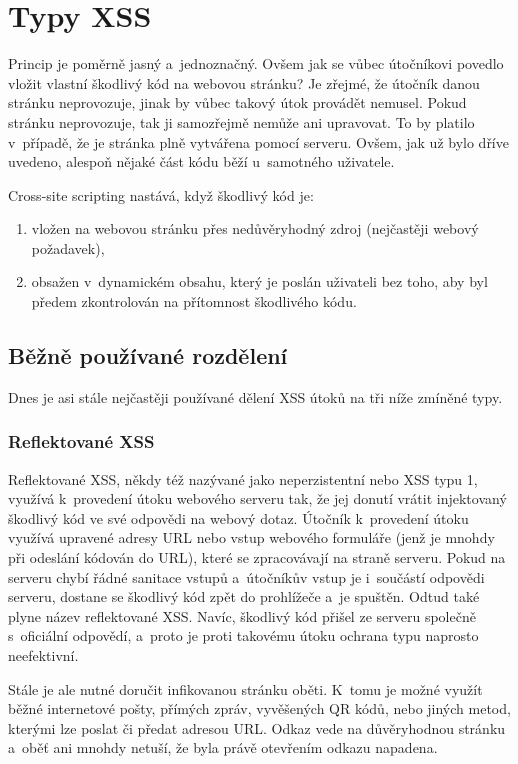 \documentclass[11pt, conference, a4paper]{IEEEtran}
\begin{document}
\section{Typy XSS}
Princip je poměrně jasný a~jednoznačný. Ovšem jak se vůbec útočníkovi povedlo vložit vlastní škodlivý kód na webovou stránku? Je zřejmé, že útočník danou stránku neprovozuje, jinak by vůbec takový útok provádět nemusel. Pokud stránku neprovozuje, tak ji samozřejmě nemůže ani upravovat. To by platilo v~případě, že je stránka plně vytvářena pomocí serveru. Ovšem, jak už bylo dříve uvedeno, alespoň nějaké část kódu běží u~samotného uživatele. 

Cross-site scripting nastává, když škodlivý kód je:
\begin{enumerate}
    \item vložen na webovou stránku přes nedůvěryhodný zdroj (nejčastěji webový požadavek),
    \item obsažen v~dynamickém obsahu, který je poslán uživateli bez toho, aby byl předem zkontrolován na přítomnost škodlivého kódu.
\end{enumerate}

\subsection{Běžně používané rozdělení}
Dnes je asi stále nejčastěji používané dělení XSS útoků na tři níže zmíněné typy. 

\subsubsection{Reflektované XSS}
Reflektované XSS, někdy též nazývané jako neperzistentní nebo XSS typu 1, využívá k~provedení útoku webového serveru tak, že jej donutí vrátit injektovaný škodlivý kód ve své odpovědi na webový dotaz. Útočník k~provedení útoku využívá upravené adresy URL nebo vstup webového formuláře (jenž je mnohdy při odeslání kódován do URL), které se zpracovávají na straně serveru. Pokud na serveru chybí řádné sanitace vstupů a~útočníkův vstup je i~součástí odpovědi serveru, dostane se škodlivý kód zpět do prohlížeče a~je spuštěn. Odtud také plyne název reflektované XSS. Navíc, škodlivý kód přišel ze serveru společně s~oficiální odpovědí, a~proto je proti takovému útoku ochrana typu  naprosto neefektivní. 

Stále je ale nutné doručit infikovanou stránku oběti. K~tomu je možné využít běžné internetové pošty, přímých zpráv, vyvěšených QR kódů, nebo jiných metod, kterými lze poslat či předat adresou URL. Odkaz vede na důvěryhodnou stránku a~oběť ani mnohdy netuší, že byla právě otevřením odkazu napadena.
\end{document}
